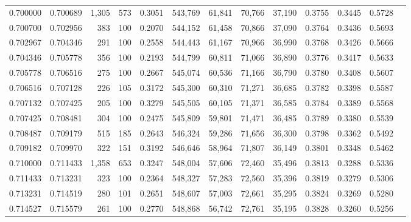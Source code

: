 \begin{tabular}{rrrrrrrrrrrrr}
0.700000 & 0.700689 & 1,305 & 573 &                                     0.3051 & 543,769 &  61,841 &  70,766 &  37,190 & 0.3755 & 0.3445 & 0.5728 \\
0.700700 & 0.702956 &   383 & 100 &                                     0.2070 & 544,152 &  61,458 &  70,866 &  37,090 & 0.3764 & 0.3436 & 0.5693 \\
0.702967 & 0.704346 &   291 & 100 &                                     0.2558 & 544,443 &  61,167 &  70,966 &  36,990 & 0.3768 & 0.3426 & 0.5666 \\
0.704346 & 0.705778 &   356 & 100 &                                     0.2193 & 544,799 &  60,811 &  71,066 &  36,890 & 0.3776 & 0.3417 & 0.5633 \\
0.705778 & 0.706516 &   275 & 100 &                                     0.2667 & 545,074 &  60,536 &  71,166 &  36,790 & 0.3780 & 0.3408 & 0.5607 \\
0.706516 & 0.707128 &   226 & 105 &                                     0.3172 & 545,300 &  60,310 &  71,271 &  36,685 & 0.3782 & 0.3398 & 0.5587 \\
0.707132 & 0.707425 &   205 & 100 &                                     0.3279 & 545,505 &  60,105 &  71,371 &  36,585 & 0.3784 & 0.3389 & 0.5568 \\
0.707425 & 0.708481 &   304 & 100 &                                     0.2475 & 545,809 &  59,801 &  71,471 &  36,485 & 0.3789 & 0.3380 & 0.5539 \\
0.708487 & 0.709179 &   515 & 185 &                                     0.2643 & 546,324 &  59,286 &  71,656 &  36,300 & 0.3798 & 0.3362 & 0.5492 \\
0.709182 & 0.709970 &   322 & 151 &                                     0.3192 & 546,646 &  58,964 &  71,807 &  36,149 & 0.3801 & 0.3348 & 0.5462 \\
0.710000 & 0.711433 & 1,358 & 653 &                                     0.3247 & 548,004 &  57,606 &  72,460 &  35,496 & 0.3813 & 0.3288 & 0.5336 \\
0.711433 & 0.713231 &   323 & 100 &                                     0.2364 & 548,327 &  57,283 &  72,560 &  35,396 & 0.3819 & 0.3279 & 0.5306 \\
0.713231 & 0.714519 &   280 & 101 &                                     0.2651 & 548,607 &  57,003 &  72,661 &  35,295 & 0.3824 & 0.3269 & 0.5280 \\
0.714527 & 0.715579 &   261 & 100 &                                     0.2770 & 548,868 &  56,742 &  72,761 &  35,195 & 0.3828 & 0.3260 & 0.5256 \\

\end{tabular}
